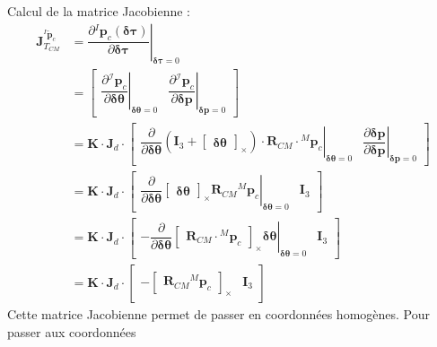 \documentclass[a4paper]{article}
\begin{document}
\noindent Calcul de la matrice Jacobienne :
\begin{subequations}
\begin{align}
\bm{J}^{{}^I\tilde{\bm{p}}_c}_{T_{CM}} &= \left.\dfrac{\partial{}^I\bm{p}_c(\bm{\delta\tau})}{\partial\bm{\delta\tau}}
\right|_{\bm{\delta\tau}=0} \\
&= \begin{bmatrix} \left.\dfrac{\partial{}^{\mathcal{I}}\bm{p}_c}{\partial\bm{\delta\theta}} \right|_{\bm{\delta\theta}=0} 
& \left.\dfrac{\partial{}^{\mathcal{I}}\bm{p}_c}{\partial\bm{\delta{p}}} 
\right|_{\bm{\delta{p}}=0} \end{bmatrix}\\
&= \bm{K} \cdot \bm{J}_d \cdot 
\begin{bmatrix} 
\left.\dfrac{\partial}{\partial\bm{\delta\theta}}
\left( \bm{I}_3 + \begin{bmatrix} \bm{\delta\theta} \end{bmatrix}_{\times} \right) \cdot \bm{R}_{CM} \cdot {}^M\bm{p}_c
\right|_{\bm{\delta\theta}=0}
&
\left.\dfrac{\partial\bm{\delta{p}}}{\partial\bm{\delta{p}}}
\right|_{\bm{\delta{p}}=0}
\end{bmatrix}\\
&= \bm{K} \cdot \bm{J}_d \cdot \begin{bmatrix} 
\left.\dfrac{\partial}{\partial\bm{\delta\theta}} \begin{bmatrix} \bm{\delta\theta} \end{bmatrix}_{\times} \bm{R}_{CM} {}^M\bm{p}_c \right|_{\bm{\delta\theta}=0}
& \bm{I}_3 \end{bmatrix}\\
&= \bm{K} \cdot \bm{J}_d \cdot \begin{bmatrix} - \left. \dfrac{\partial}{\partial\bm{\delta\theta}} 
\begin{bmatrix} \bm{R}_{CM} \cdot {}^M\bm{p}_c \end{bmatrix}_{\times} \bm{\delta\theta} 
\right|_{\bm{\delta\theta}=0}
& \bm{I}_3\end{bmatrix}\\
&= \bm{K} \cdot \bm{J}_d \cdot \begin{bmatrix} - \begin{bmatrix} \bm{R}_{CM}{}^M\bm{p}_c \end{bmatrix}_{\times} & \bm{I}_3 \end{bmatrix}
\end{align}
\end{subequations}
Cette matrice Jacobienne permet de passer en coordonnées homogènes. Pour passer aux coordonnées 
\end{document}
